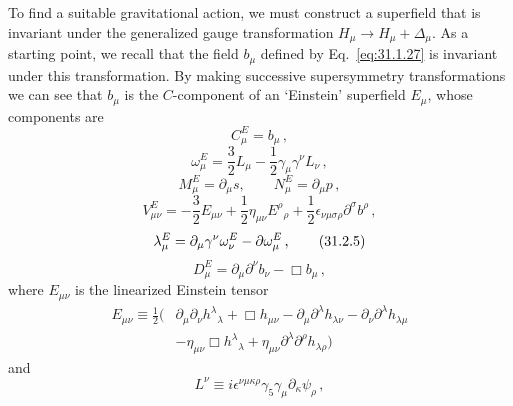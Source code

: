 To find a suitable gravitational action, we must construct a superfield that
is invariant under the generalized gauge transformation
\(H_\mu\to H_\mu+\Delta_\mu\). As a starting point, we recall that the field
\(b_\mu\) defined by Eq.~\eqref{eq:31.1.27} is invariant under this
transformation. By making successive supersymmetry transformations we can see
that \(b_\mu\) is the \(C\)-component of an `Einstein' superfield \(E_\mu\),
whose components are
\begin{equation}
  C_\mu^E=b_\mu\,,
  \tag{31.2.1}\label{eq:31.2.1}
\end{equation}
\begin{equation}
  \omega_\mu^E
  =\frac32L_\mu-\frac12\gamma_\mu\gamma^\nu L_\nu\,,
  \tag{31.2.2}\label{eq:31.2.2}
\end{equation}
\begin{equation}
  M_\mu^E=\partial_\mu s,\qquad
  N_\mu^E=\partial_\mu p\,,
  \tag{31.2.3}\label{eq:31.2.3}
\end{equation}
\begin{equation}
  V_{\mu\nu}^E
  =-\frac32E_{\mu\nu}
   +\frac12\eta_{\mu\nu}E^\rho{}_\rho
   +\frac12\epsilon_{\nu\mu\sigma\rho}\partial^\sigma b^\rho\,,
  \tag{31.2.4}\label{eq:31.2.4}
\end{equation}
\begin{equation}
  \lambda_\mu^E
  =\partial_\mu\gamma^\nu\omega_\nu^E-\sl{\partial}\omega_\mu^E\,,
  \tag{31.2.5}\label{eq:31.2.5}
\end{equation}
\begin{equation}
  D_\mu^E=\partial_\mu\partial^\nu b_\nu-\Box b_\mu\,,
  \tag{31.2.6}\label{eq:31.2.6}
\end{equation}
where \(E_{\mu\nu}\) is the linearized Einstein tensor
\begin{equation}
  \begin{aligned}
  E_{\mu\nu}\equiv\frac12\bigl(
    &\partial_\mu\partial_\nu h^\lambda{}_\lambda
     +\Box h_{\mu\nu}
     -\partial_\mu\partial^\lambda h_{\lambda\nu}
     -\partial_\nu\partial^\lambda h_{\lambda\mu}
  \\
    &-\eta_{\mu\nu}\Box h^\lambda{}_\lambda
     +\eta_{\mu\nu}\partial^\lambda\partial^\rho h_{\lambda\rho}
  \bigr)
  \end{aligned}
  \tag{31.2.7}\label{eq:31.2.7}
\end{equation}
and
\begin{equation}
  L^\nu\equiv
  i\epsilon^{\nu\mu\kappa\rho}\gamma_5\gamma_\mu
  \partial_\kappa\psi_\rho\,,
  \tag{31.2.8}\label{eq:31.2.8}
\end{equation}
